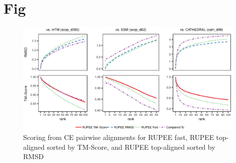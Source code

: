 \documentclass[letter]{article}
\begin{document}
\section{Fig}

\begin{figure}[!h]
\begin{center}
    \includegraphics[width=6in, keepaspectratio]{combined_scoring_ce}
\end{center}
\caption{Scoring from CE pairwise alignments for RUPEE fast, RUPEE top-aligned sorted by TM-Score, and RUPEE top-aligned sorted by RMSD}
\label{fig:combined_scoring_ce}
\end{figure}
\end{document}

